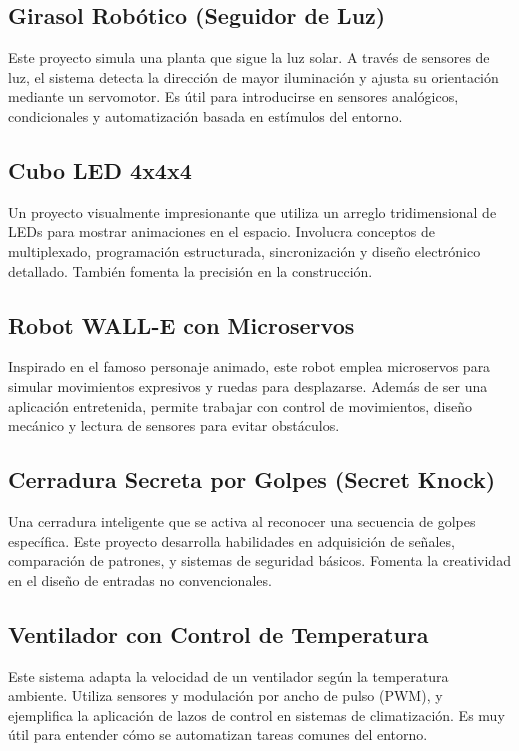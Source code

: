\documentclass[a4paper,11pt]{article}
\begin{document}
\subsection{Girasol Robótico (Seguidor de Luz)}
Este proyecto simula una planta que sigue la luz solar. A través de sensores de luz, el sistema detecta la dirección de mayor iluminación y ajusta su orientación mediante un servomotor. Es útil para introducirse en sensores analógicos, condicionales y automatización basada en estímulos del entorno.

\subsection{Cubo LED 4x4x4}
Un proyecto visualmente impresionante que utiliza un arreglo tridimensional de LEDs para mostrar animaciones en el espacio. Involucra conceptos de multiplexado, programación estructurada, sincronización y diseño electrónico detallado. También fomenta la precisión en la construcción.

\subsection{Robot WALL-E con Microservos}
Inspirado en el famoso personaje animado, este robot emplea microservos para simular movimientos expresivos y ruedas para desplazarse. Además de ser una aplicación entretenida, permite trabajar con control de movimientos, diseño mecánico y lectura de sensores para evitar obstáculos.

\subsection{Cerradura Secreta por Golpes (Secret Knock)}
Una cerradura inteligente que se activa al reconocer una secuencia de golpes específica. Este proyecto desarrolla habilidades en adquisición de señales, comparación de patrones, y sistemas de seguridad básicos. Fomenta la creatividad en el diseño de entradas no convencionales.

\subsection{Ventilador con Control de Temperatura}
Este sistema adapta la velocidad de un ventilador según la temperatura ambiente. Utiliza sensores y modulación por ancho de pulso (PWM), y ejemplifica la aplicación de lazos de control en sistemas de climatización. Es muy útil para entender cómo se automatizan tareas comunes del entorno.
\end{document}
